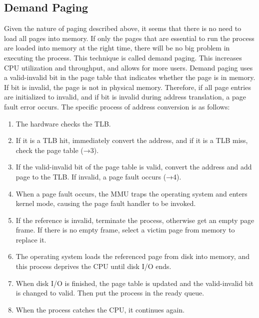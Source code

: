 \documentclass{homework}
\begin{document}
\subsection{Demand Paging}
Given the nature of paging described above, it seems that there is no need to load all pages into memory. If only the pages that are essential to run the process are loaded into memory at the right time, there will be no big problem in executing the process. This technique is called demand paging. This increases CPU utilization and throughput, and allows for more users.
Demand paging uses a valid-invalid bit in the page table that indicates whether the page is in memory. If bit is invalid, the page is not in physical memory. Therefore, if all page entries are initialized to invalid, and if bit is invalid during address translation, a page fault error occurs. 
The specific process of address conversion is as follows:

\begin{enumerate}
    \item The hardware checks the TLB.
    \item If it is a TLB hit, immediately convert the address, and if it is a TLB miss, check the page table (→3). 
    \item If the valid-invalid bit of the page table is valid, convert the address and add page to the TLB. If invalid, a page fault occurs (→4).
    \item When a page fault occurs, the MMU traps the operating system and enters kernel mode, causing the page fault handler to be invoked.
    \item If the reference is invalid, terminate the process, otherwise get an empty page frame. If there is no empty frame, select a victim page from memory to replace it.  
    \item The operating system loads the referenced page from disk into memory, and this process deprives the CPU until disk I/O ends.
    \item When disk I/O is finished, the page table is updated and the valid-invalid bit is changed to valid. Then put the process in the ready queue. 
    \item When the process catches the CPU, it continues again.
\end{enumerate}
\end{document}
